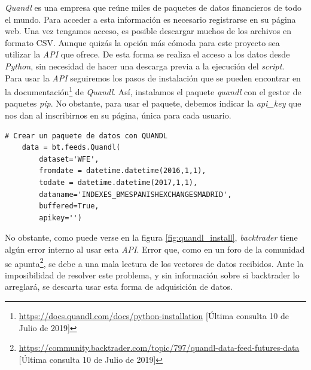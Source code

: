 		\textit{Quandl} es una empresa que re\'une miles de paquetes de datos financieros de todo el mundo. Para acceder a esta informaci\'on es necesario registrarse en su p\'agina web. Una vez tengamos acceso, es posible descargar muchos de los archivos en formato CSV. Aunque quiz\'as la opci\'on m\'as c\'omoda para este proyecto sea utilizar la \textit{API} que ofrece. De esta forma se realiza el acceso a los datos desde \textit{Python}, sin necesidad de hacer una descarga previa a la ejecuci\'on del \textit{script}.\\
		
		Para usar la \textit{API} seguiremos los pasos de instalaci\'on que se pueden encontrar en la documentaci\'on\footnote{\url{https://docs.quandl.com/docs/python-installation} [\'Ultima consulta 10 de Julio de 2019]} de \textit{Quandl}. As\'i, instalamos el paquete \textit{quandl} con el gestor de paquetes \textit{pip}. No obstante, para usar el paquete, debemos indicar la \textit{api\_key} que nos dan al inscribirnos en su p\'agina, \'unica para cada usuario.\\
		
		\begin{lstlisting}[basicstyle=\tiny]
# Crear un paquete de datos con QUANDL
	data = bt.feeds.Quandl(
		dataset='WFE',
		fromdate = datetime.datetime(2016,1,1),
		todate = datetime.datetime(2017,1,1),
		dataname='INDEXES_BMESPANISHEXCHANGESMADRID',
		buffered=True,
		apikey='')
		\end{lstlisting}

			
			

		No obstante, como puede verse en la figura \ref{fig:quandl_install}, \textit{backtrader} tiene alg\'un error interno al usar esta \textit{API}. Error que, como en un foro de la comunidad se apunta\footnote{\url{https://community.backtrader.com/topic/797/quandl-data-feed-futures-data} [\'Ultima consulta 10 de Julio de 2019]}, se debe a una mala lectura de los vectores de datos recibidos. Ante la imposibilidad de resolver este problema, y sin informaci\'on sobre si backtrader lo arreglar\'a, se descarta usar esta forma de adquisici\'on de datos.
		
